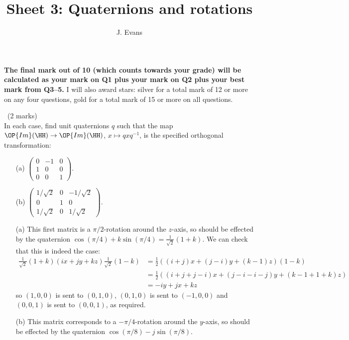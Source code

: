 \documentclass[12pt]{article}
\title{Sheet 3: Quaternions and rotations}
\author{J. Evans}
\date{}
\begin{document}
\maketitle

\bigskip

{\bf The final mark out of 10 (which counts towards your grade) will be calculated as your mark on Q1 plus your mark on Q2 plus your best mark from Q3--5.} I will also award stars: silver for a total mark of 12 or more on any four questions, gold for a total mark of 15 or more on all questions. 

\vspace{1cm}

\begin{question}\ (2 marks)\\
  In each case, find unit quaternions $q$ such that the map $\OP{Im}(\HH)\to\OP{Im}(\HH)$, $x\mapsto qxq^{-1}$, is the specified orthogonal transformation:
  \begin{enumerate}
  \item[(a)] $\left(\begin{array}{ccc}0 & -1 & 0\\ 1 & 0 & 0\\ 0 & 0 & 1\end{array}\right)$.
  \item[(b)] $\left(\begin{array}{ccc}1/\sqrt{2} & 0 & -1/\sqrt{2}\\ 0 & 1 & 0\\ 1/\sqrt{2} & 0 & 1/\sqrt{2}\end{array}\right)$.
  \end{enumerate}
\end{question}

\begin{answer}
  \begin{enumerate}
  \item[(a)] This first matrix is a $\pi/2$-rotation around the $z$-axis, so should be effected by the quaternion $\cos(\pi/4)+k\sin(\pi/4)=\frac{1}{\sqrt{2}}(1+k)$. We can check that this is indeed the case:
    \begin{align*}
      \frac{1}{\sqrt{2}}(1+k)(ix+jy+kz)\frac{1}{\sqrt{2}}(1-k)&=\frac{1}{2}((i+j)x+(j-i)y+(k-1)z)(1-k)\\
      &=\frac{1}{2}((i+j+j-i)x+(j-i-i-j)y+(k-1+1+k)z)\\
      &=-iy+jx+kz
    \end{align*}
    so $(1,0,0)$ is sent to $(0,1,0)$, $(0,1,0)$ is sent to $(-1,0,0)$ and $(0,0,1)$ is sent to $(0,0,1)$, as required.
  \item[(b)] This matrix corresponds to a $-\pi/4$-rotation around the $y$-axis, so should be effected by the quaternion $\cos(\pi/8)-j\sin(\pi/8)$.
  \end{enumerate}
\end{answer}
\newpage
\end{document}
